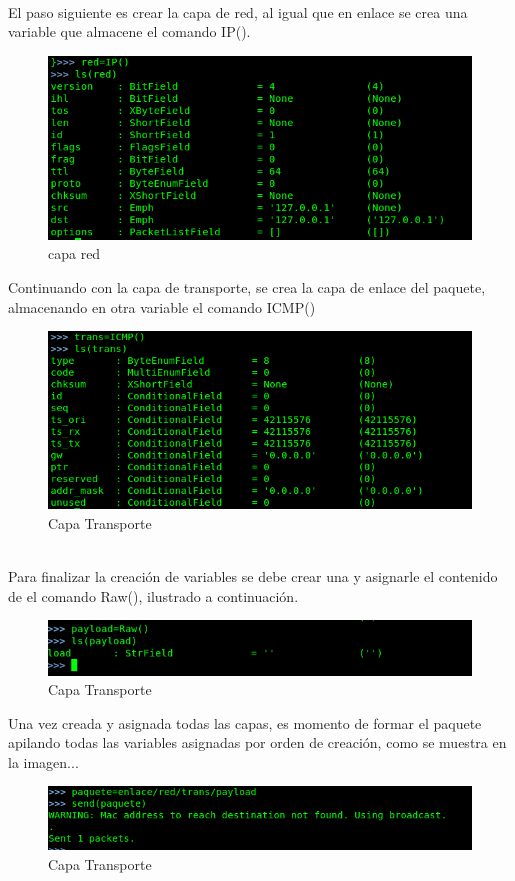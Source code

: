 \documentclass[spanish]{udpreport}
\begin{document}
\\El paso siguiente es crear la capa de red, al igual que en enlace se crea una variable que almacene el comando IP().
\begin{figure}[h]
    \centering
    \includegraphics[scale=0.3]{images/2.png}
    \caption{capa red}
    \label{fig:my_label}
\end{figure}
\newpage
Continuando con la capa de transporte, se crea la capa de enlace del paquete, almacenando en otra variable el comando ICMP()
\begin{figure}[h]
    \centering
    \includegraphics[scale=0.3]{images/3.png}
    \caption{Capa Transporte}
    \label{fig:my_label}
\end{figure}
\\Para finalizar la creación de variables se debe crear una y asignarle el contenido de el comando Raw(), ilustrado a continuación.
\begin{figure}[h]
    \centering
    \includegraphics[scale=0.3]{images/4.png}
    \caption{Capa Transporte}
    \label{fig:my_label}
\end{figure}
Una vez creada y asignada todas las capas, es momento de formar el paquete apilando todas las variables asignadas por orden de creación, como se muestra en la imagen...
\begin{figure}[h]
    \centering
    \includegraphics[scale=0.3]{images/5.png}
    \caption{Capa Transporte}
    \label{fig:my_label}
\end{figure}
\end{document}
